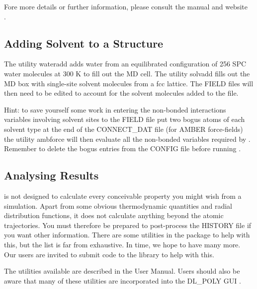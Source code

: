 Fore more details or further information, please consult the \F manual and
website \\ \WEF{}.

\subsection{Adding Solvent to a Structure}

The utility {\sc wateradd} adds water from an equilibrated
configuration of 256 SPC water molecules at 300 K to fill out the
MD cell.  The utility {\sc solvadd} fills out the MD box with
single-site solvent molecules from a fcc lattice.  The FIELD files
will then need to be edited to account for the solvent molecules
added to the file.

Hint: to save yourself some work in entering the non-bonded
interactions variables involving solvent sites to the FIELD file put
two bogus atoms of each solvent type at the end of the CONNECT\_DAT
file (for AMBER force-fields) the
utility {\sc ambforce} will then evaluate all the
non-bonded variables required by \D.
Remember to delete the bogus entries from the CONFIG file before
running \D.

\subsection{Analysing Results}

\D is not designed to calculate every conceivable property you
might wish from a simulation.  Apart from some obvious
thermodynamic quantities and radial distribution functions, it
does not calculate anything beyond the atomic trajectories.  You
must therefore be prepared to post-process the HISTORY file if you
want other information.  There are some utilities in the \D
package to help with this, but the list is far from exhaustive. In
time, we hope to have many more.  Our users are invited to submit
code to the  library to help with this.

The utilities available are described in the \C User
Manual.  Users should also be aware that many of these utilities are
incorporated into the DL\_POLY GUI \cite{smith-gui}.
